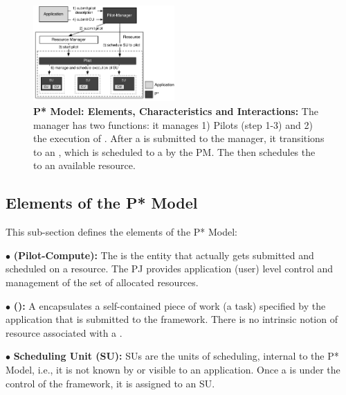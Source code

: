 \documentclass{sig-alternate}
\begin{document}
\begin{figure}[t]
    \centering
    \includegraphics[width=0.48\textwidth]{figures/pstar_model_single.pdf}
    \caption{ \textbf{P* Model: Elements, Characteristics and
        Interactions:} The manager has two functions: it manages 1)
      Pilots (step 1-3) and 2) the execution of \cus. After a \cu is
      submitted to the manager, it transitions to an \su, which is
      scheduled to a \pilot by the PM. The \pilot then schedules the
      \su to an available resource.  }
    \label{fig:figures_pstar}
\end{figure}

\noindent 
\subsection{Elements of the P* Model}


\noindent This sub-section defines the elements of the P* Model:


\noindent$\bullet$ \textbf{\pilot (Pilot-Compute):} The \pilot is the
  entity that actually gets submitted and scheduled on a resource.
  The PJ provides application (user)
  level control and management of the set of allocated resources.



\noindent$\bullet$ \textbf{\computeunit  (\cu):} A \cu  encapsulates a 
  self-contained piece of work (a task) specified by the application that is
  submitted to the \pilotjob framework. There is no intrinsic notion
  of resource associated with a \cu.

\noindent$\bullet$ \textbf{Scheduling Unit (SU):} SUs are the units of 
  scheduling, internal to the P* Model, i.e., it is not known by or
  visible to an application. Once a \cu is
  under the control of the \pilotjob framework, it is assigned
  to an SU.
\end{document}
